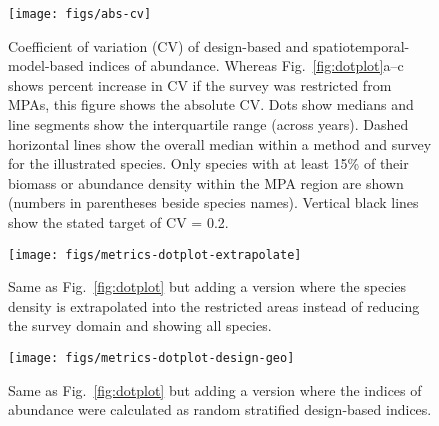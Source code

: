 \documentclass[12pt]{article}
\begin{document}
\clearpage



\begin{figure}[htb]
    \centering
    \texttt{[image: figs/abs-cv]}
    \caption{Coefficient of variation (CV) of design-based and spatiotemporal-model-based indices of abundance. Whereas Fig.~\ref{fig:dotplot}a--c shows percent increase in CV if the survey was restricted from MPAs, this figure shows the absolute CV. Dots show medians and line segments show the interquartile range (across years). Dashed horizontal lines show the overall median within a method and survey for the illustrated species. Only species with at least 15\% of their biomass or abundance density within the MPA region are shown (numbers in parentheses beside species names). Vertical black lines show the stated target of CV = 0.2.}
    \label{fig:cv-abs}
\end{figure}


\begin{figure}[htb]
    \centering
    \texttt{[image: figs/metrics-dotplot-extrapolate]}
    \caption{Same as Fig.~\ref{fig:dotplot} but adding a version where the species density is extrapolated into the restricted areas instead of reducing the survey domain and showing all species.}
    \label{fig:dotplot-extrapolate}
\end{figure}

\begin{figure}[htb]
    \centering
    \texttt{[image: figs/metrics-dotplot-design-geo]}
    \caption{Same as Fig.~\ref{fig:dotplot} but adding a version where the indices of abundance were calculated as random stratified design-based indices.}
    \label{fig:metrics-design-geo}
\end{figure}

\clearpage

\end{document}
